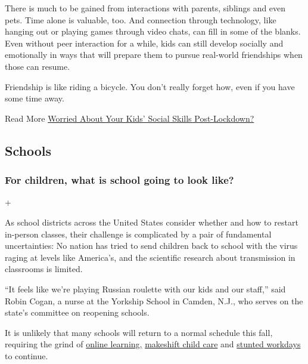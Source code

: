 There is much to be gained from interactions with parents, siblings and
even pets. Time alone is valuable, too. And connection through
technology, like hanging out or playing games through video chats, can
fill in some of the blanks. Even without peer interaction for a while,
kids can still develop socially and emotionally in ways that will
prepare them to pursue real-world friendships when those can resume.

Friendship is like riding a bicycle. You don't really forget how, even
if you have some time away.

 Read More
\href{https://www.nytimes3xbfgragh.onion/2020/06/18/parenting/kids-social-needs-quarantine.html}{Worried
About Your Kids' Social Skills Post-Lockdown?}

\hypertarget{schools}{%
\subsection{Schools}\label{schools}}

\hypertarget{for-children-what-is-school-going-to-look-like}{%
\subsubsection{For children, what is school going to look
like?}\label{for-children-what-is-school-going-to-look-like}}

+

As school districts across the United States consider whether and how to
restart in-person classes, their challenge is complicated by a pair of
fundamental uncertainties: No nation has tried to send children back to
school with the virus raging at levels like America's, and the
scientific research about transmission in classrooms is limited.

``It feels like we're playing Russian roulette with our kids and our
staff,'' said Robin Cogan, a nurse at the Yorkship School in Camden,
N.J., who serves on the state's committee on reopening schools.

It is unlikely that many schools will return to a normal schedule this
fall, requiring the grind of
\href{https://www.nytimes3xbfgragh.onion/2020/06/05/us/coronavirus-education-lost-learning.html}{online
learning,}
\href{https://www.nytimes3xbfgragh.onion/2020/05/29/us/coronavirus-child-care-centers.html}{makeshift
child care} and
\href{https://www.nytimes3xbfgragh.onion/2020/06/03/business/economy/coronavirus-working-women.html}{stunted
workdays} to continue.

